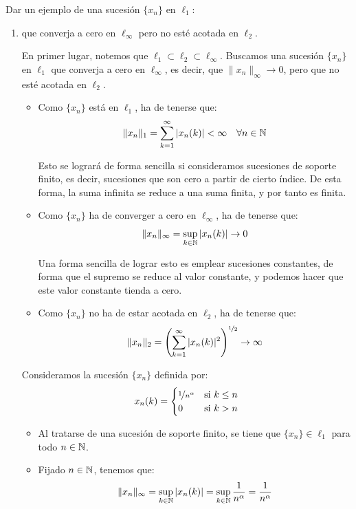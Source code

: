 \begin{ejercicio}
Dar un ejemplo de una sucesión $\{x_n\}$ en $\ell_1$:
\begin{enumerate}
    \item que converja a cero en $\ell_\infty$ pero no esté acotada en $\ell_2$.
    
    En primer lugar, notemos que $\ell_1 \subset \ell_2 \subset \ell_\infty$. Buscamos una sucesión $\{x_n\}$ en $\ell_1$ que converja a cero en $\ell_\infty$, es decir, que $\|x_n\|_\infty \to 0$, pero que no esté acotada en $\ell_2$.
    \begin{itemize}
        \item Como $\{x_n\}$ está en $\ell_1$, ha de tenerse que:
        \begin{equation*}
            \|x_n\|_1 = \sum_{k=1}^\infty |x_n(k)| < \infty \quad \forall n \in \mathbb{N}
        \end{equation*}
        
        Esto se logrará de forma sencilla si consideramos sucesiones de soporte finito, es decir, sucesiones que son cero a partir de cierto índice. De esta forma, la suma infinita se reduce a una suma finita, y por tanto es finita.

        \item Como $\{x_n\}$ ha de converger a cero en $\ell_\infty$, ha de tenerse  que:
        \begin{equation*}
            \|x_n\|_\infty = \sup_{k \in \mathbb{N}} |x_n(k)| \to 0
        \end{equation*}

        Una forma sencilla de lograr esto es emplear sucesiones constantes, de forma que el supremo se reduce al valor constante, y podemos hacer que este valor constante tienda a cero.
        \item Como $\{x_n\}$ no ha de estar acotada en $\ell_2$, ha de tenerse que:
        \begin{equation*}
            \|x_n\|_2 = \left(\sum_{k=1}^\infty |x_n(k)|^2\right)^{\nicefrac{1}{2}} \to \infty
        \end{equation*}
    \end{itemize}

    Consideramos la sucesión $\{x_n\}$ definida por:
    \begin{equation*}
        x_n(k) = \begin{cases}
            \nicefrac{1}{n^\alpha} & \text{si } k \leq n\\
            0 & \text{si } k > n
        \end{cases}
    \end{equation*}
    \begin{itemize}
        \item Al tratarse de una sucesión de soporte finito, se tiene que $\{x_n\} \in \ell_1$ para todo $n \in \mathbb{N}$.
        \item Fijado $n \in \mathbb{N}$, tenemos que:
        \begin{equation*}
            \|x_n\|_\infty = \sup_{k \in \mathbb{N}} |x_n(k)| = \sup_{k \in \mathbb{N}} \frac{1}{n^\alpha} = \frac{1}{n^\alpha}
        \end{equation*}


\end{itemize}
\end{enumerate}
\end{ejercicio}
